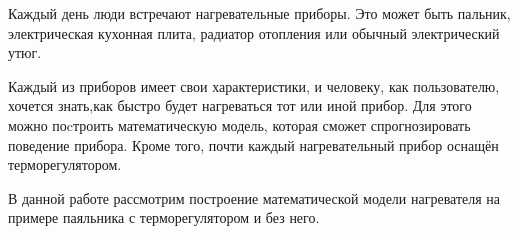 \Introduction

Каждый день люди встречают нагревательные приборы. 
Это может быть пальник, электрическая кухонная плита, радиатор отопления или обычный электрический утюг.

Каждый из приборов имеет свои характеристики, и человеку, как пользователю, хочется знать,как быстро будет нагреваться тот или иной прибор. Для этого можно поcтроить математическую модель, которая сможет спрогнозировать поведение прибора. Кроме того, почти каждый нагревательный прибор оснащён терморегулятором.

В данной работе рассмотрим построение математической модели нагревателя на примере паяльника с терморегулятором и без него.
